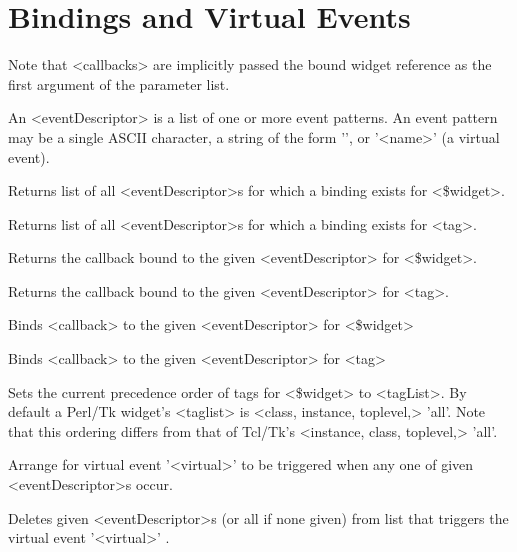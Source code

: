 \section{Bindings and Virtual Events}

Note that  <callbacks> are implicitly passed the bound widget reference
as the first argument of the parameter list.

An <eventDescriptor> is a list of one or more event patterns. An
event pattern may be a single ASCII character, a string of the form
'\gt', or '\lt\lt<name>\gt\gt' 
(a virtual event).

\begin{enum}{1cm}
Returns list of all <eventDescriptor>s for which a binding exists for <\$widget>.

Returns list of all <eventDescriptor>s for which a binding exists for <tag>.

Returns the callback bound to the given <eventDescriptor> for <\$widget>.

Returns the callback bound to the given <eventDescriptor> for <tag>.

Binds <callback> to the given <eventDescriptor> for <\$widget>

Binds <callback> to the given <eventDescriptor> for <tag>

Sets the current precedence order of tags for <\$widget> to <tagList>.
By default a Perl/Tk widget's <taglist> is <class, instance, toplevel,> 'all'.  Note that
this ordering differs from that of Tcl/Tk's <instance, class, toplevel,> 'all'.

Arrange for virtual event '\lt\lt<virtual>\gt\gt' to be triggered
when any one of given <eventDescriptor>s occur.

Deletes given <eventDescriptor>s (or all if none given) from list that 
triggers the virtual event '\lt\lt<virtual>\gt\gt' .


\end{enum}
